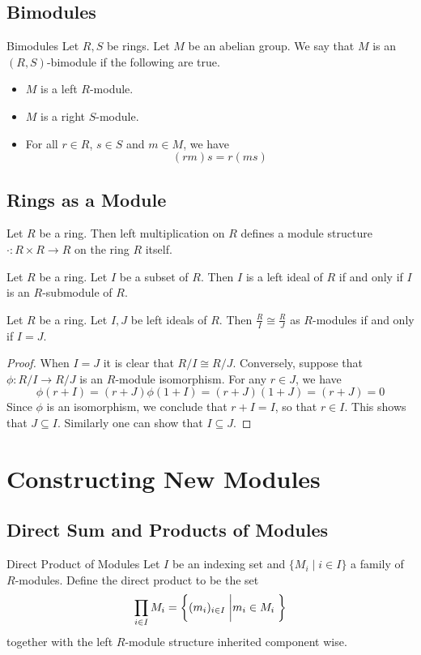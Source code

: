 \documentclass[a4paper]{article}
\begin{document}
\subsection{Bimodules}
\begin{defn}{Bimodules}{} Let $R,S$ be rings. Let $M$ be an abelian group. We say that $M$ is an $(R,S)$-bimodule if the following are true. 
\begin{itemize}
\item $M$ is a left $R$-module. 
\item $M$ is a right $S$-module. 
\item For all $r\in R$, $s\in S$ and $m\in M$, we have $$(rm)s=r(ms)$$
\end{itemize}
\end{defn}

\subsection{Rings as a Module}
Let $R$ be a ring. Then left multiplication on $R$ defines a module structure $\cdot:R\times R\to R$ on the ring $R$ itself. 

\begin{prp}{}{} Let $R$ be a ring. Let $I$ be a subset of $R$. Then $I$ is a left ideal of $R$ if and only if $I$ is an $R$-submodule of $R$. 
\end{prp}

\begin{prp}{}{} Let $R$ be a ring. Let $I,J$ be left ideals of $R$. Then $\frac{R}{I}\cong\frac{R}{J}$ as $R$-modules if and only if $I=J$. \tcbline
\begin{proof}
When $I=J$ it is clear that $R/I\cong R/J$. Conversely, suppose that $\phi:R/I\to R/J$ is an $R$-module isomorphism. For any $r\in J$, we have $$\phi(r+I)=(r+J)\phi(1+I)=(r+J)(1+J)=(r+J)=0$$ Since $\phi$ is an isomorphism, we conclude that $r+I=I$, so that $r\in I$. This shows that $J\subseteq I$. Similarly one can show that $I\subseteq J$. 
\end{proof}
\end{prp}

\pagebreak
\section{Constructing New Modules}
\subsection{Direct Sum and Products of Modules}
\begin{defn}{Direct Product of Modules}{} Let $I$ be an indexing set and $\{M_i\;|\;i\in I\}$ a family of $R$-modules. Define the direct product to be the set $$\prod_{i\in I}M_i=\left\{(m_i)_{i\in I}\;\bigg{|}m_i\in M_i\;\right\}$$ together with the left $R$-module structure inherited component wise. 
\end{defn}
\end{document}
